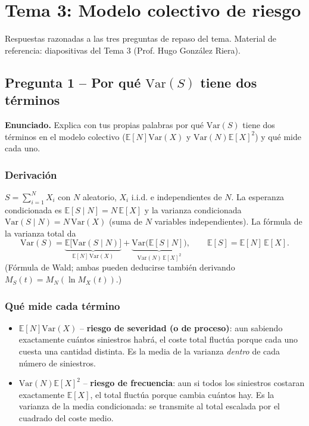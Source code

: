 \documentclass[a4paper,12pt]{article}
\newcommand{\E}{\mathbb{E}}
\newcommand{\Var}{\mathrm{Var}}
\begin{document}
\restoregeometry
\newpage
{}
\setcounter{page}{1}

\section{Tema 3: Modelo colectivo de riesgo}
\label{sec:tema3repaso}
\noindent
Respuestas razonadas a las tres preguntas de repaso del tema. Material de referencia: diapositivas del Tema 3 (Prof. Hugo González Riera).

\subsection{Pregunta 1 -- Por qu\'e $\Var(S)$ tiene dos t\'erminos}

\noindent\textbf{Enunciado.} Explica con tus propias palabras por qu\'e $\Var(S)$ tiene dos t\'erminos en el modelo colectivo ($\E[N]\Var(X)$ y $\Var(N)\E[X]^2$) y qu\'e mide cada uno.

\subsubsection*{Derivaci\'on}
$S=\sum_{i=1}^NX_i$ con $N$ aleatorio, $X_i$ i.i.d. e independientes de $N$. La esperanza condicionada es $\E[S\mid N]=N\,\E[X]$ y la varianza condicionada $\Var(S\mid N)=N\,\Var(X)$ (suma de $N$ variables independientes). La f\'ormula de la varianza total da
\[
\Var(S)=\underbrace{\E\big[\Var(S\mid N)\big]}_{\E[N]\,\Var(X)}+\underbrace{\Var\big(\E[S\mid N]\big)}_{\Var(N)\,\E[X]^2},\qquad \E[S]=\E[N]\,\E[X].
\]
(F\'ormula de Wald; ambas pueden deducirse tambi\'en derivando $M_S(t)=M_N(\ln M_X(t))$.)

\subsubsection*{Qu\'e mide cada t\'ermino}
\begin{itemize}[leftmargin=*]
\item $\E[N]\Var(X)$ -- \textbf{riesgo de severidad (o de proceso)}: aun sabiendo exactamente cu\'antos siniestros habr\'a, el coste total fluct\'ua porque cada uno cuesta una cantidad distinta. Es la media de la varianza \emph{dentro} de cada n\'umero de siniestros.
\item $\Var(N)\E[X]^2$ -- \textbf{riesgo de frecuencia}: aun si todos los siniestros costaran exactamente $\E[X]$, el total fluct\'ua porque cambia cu\'antos hay. Es la varianza de la media condicionada: se transmite al total escalada por el cuadrado del coste medio.
\end{itemize}
\end{document}
